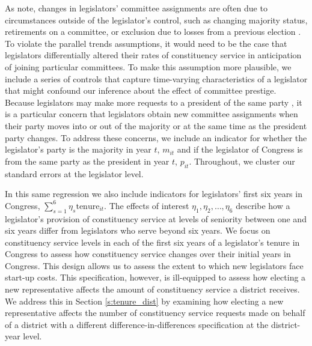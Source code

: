 \documentclass[12pt]{article}
\begin{document}
As \cite{BerryFowler2016} note, changes in legislators' committee assignments are often due to circumstances outside of the legislator's control, such as changing majority status, retirements on a committee, or exclusion due to losses from a previous election \citep{GrimmerPowell2013}. To violate the parallel trends assumptions, it would need to be the case that legislators differentially altered their rates of constituency service in anticipation of joining particular committees. To make this assumption more plausible, we include a series of controls that capture time-varying characteristics of a legislator that might confound our inference about the effect of committee prestige. Because legislators may make more requests to a president of the same party \citep{BerryBurdenHowell09}, it is a particular concern that legislators obtain new committee assignments when their party moves into or out of the majority or at the same time as the president party changes. To address these concerns, we include an indicator for whether the legislator's party is the majority in year $t$, $m_{it}$ and if the legislator of Congress is from the same party as the president in year $t$, $p_{it}$. Throughout, we cluster our standard errors at the legislator level.

In this same regression we also include indicators for legislators' first six years in Congress, $ \sum_{s = 1}^{6} \eta_{s} \text{tenure}_{it}$. The effects of interest $\eta_{1}, \eta_{2}, \hdots, \eta_{6}$ describe how a legislator's provision of constituency service at levels of seniority between one and six years differ from legislators who serve beyond six years. We focus on constituency service levels in each of the first six years of a legislator's tenure in Congress to assess how constituency service changes over their initial years in Congress. This design allows us to assess the extent to which new legislators face start-up costs. This specification, however, is ill-equipped to assess how electing a new representative affects the amount of constituency service a district receives. We address this in Section \ref{s:tenure_dist} by examining how electing a new representative affects the number of constituency service requests made on behalf of a district with a different difference-in-differences specification at the district-year level.   

\end{document}
